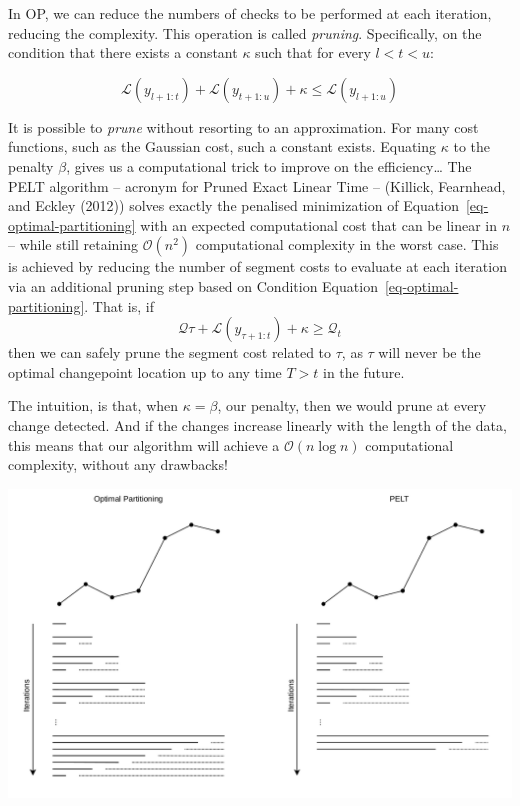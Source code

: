 \documentclass[
  letterpaper,
  DIV=11,
  numbers=noendperiod]{scrreprt}
\begin{document}
In OP, we can reduce the numbers of checks to be performed at each
iteration, reducing the complexity. This operation is called
\emph{pruning}. Specifically, on the condition that there exists a
constant \(\kappa\) such that for every \(l < t < u\):

\[
        \mathcal{L}(y_{l + 1:t}) + \mathcal{L}(y_{t + 1:u}) + \kappa \leq \mathcal{L}(y_{l + 1:u})
\]

It is possible to \emph{prune} without resorting to an approximation.
For many cost functions, such as the Gaussian cost, such a constant
exists. Equating \(\kappa\) to the penalty \(\beta\), gives us a
computational trick to improve on the efficiency\ldots{} The PELT
algorithm -- acronym for Pruned Exact Linear Time -- (Killick,
Fearnhead, and Eckley (2012)) solves exactly the penalised minimization
of Equation~\ref{eq-optimal-partitioning} with an expected computational
cost that can be linear in \(n\) -- while still retaining
\(\mathcal{O}(n^2)\) computational complexity in the worst case. This is
achieved by reducing the number of segment costs to evaluate at each
iteration via an additional pruning step based on Condition
Equation~\ref{eq-optimal-partitioning}. That is, if
\[\mathcal{Q}\tau + \mathcal{L}(y_{\tau + 1:t}) + \kappa \geq \mathcal{Q}_t\]
then we can safely prune the segment cost related to \(\tau\), as
\(\tau\) will never be the optimal changepoint location up to any time
\(T > t\) in the future.

The intuition, is that, when \(\kappa = \beta\), our penalty, then we
would prune at every change detected. And if the changes increase
linearly with the length of the data, this means that our algorithm will
achieve a \(\mathcal{O}(n \log n)\) computational complexity, without
any drawbacks!

\includegraphics{source_imgs/OPPELT.png}
\end{document}
